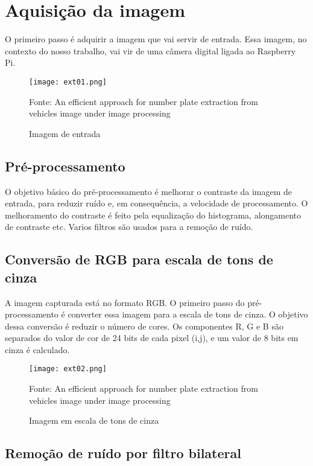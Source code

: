 \section{Aquisição da imagem}

O primeiro passo é adquirir a imagem que vai servir de entrada. Essa imagem, no
contexto do nosso trabalho, vai vir de uma câmera digital ligada ao Raspberry
Pi.

\begin{figure}[H]
	\centering
	\texttt{[image: ext01.png]}
	\caption{Imagem de entrada}
Fonte: An efficient approach for number plate extraction from vehicles image under image processing~\cite{kaur2014efficient}
	\label{fig:ext_input_image}
\end{figure}

\subsection{Pré-processamento}

O objetivo básico do pré-processamento é melhorar o contraste da imagem de
entrada, para reduzir ruído e, em consequência, a velocidade de
processamento. O melhoramento do contraste é feito pela equalização do
histograma, alongamento de contraste etc. Varios filtros são usados para a
remoção de ruído.

\subsection{Conversão de RGB para escala de tons de cinza}

A imagem capturada está no formato RGB\@. O primeiro passo do pré-processamento é
converter essa imagem para a escala de tons de cinza. O objetivo dessa conversão é reduzir
o número de cores. Os componentes R, G e B são separados do valor de cor de 24
bits de cada pixel (i,j), e um valor de 8 bits em cinza é calculado.

\begin{figure}[H]
	\centering
	\texttt{[image: ext02.png]}
	\caption{Imagem em escala de tons de cinza}
Fonte: An efficient approach for number plate extraction from vehicles image under image processing~\cite{kaur2014efficient}
	\label{fig:ext_gray_scale}
\end{figure}

\subsection{Remoção de ruído por filtro bilateral}

